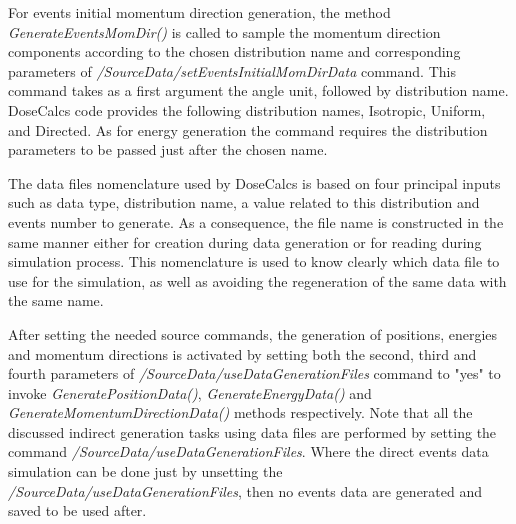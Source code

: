 \documentclass[letterpaper,12pt]{article}
\begin{document}
For events initial momentum direction generation, the method \textit{GenerateEventsMomDir()} is called to sample the momentum direction components according to the chosen distribution name and corresponding parameters of \textit{/SourceData/setEventsInitialMomDirData} command. This command takes as a first argument the angle unit, followed by distribution name. DoseCalcs code provides the following distribution names, Isotropic, Uniform, and Directed. As for energy generation the command requires the distribution parameters to be passed just after the chosen name.

The data files nomenclature used by DoseCalcs is based on four principal inputs such as data type, distribution name, a value related to this distribution and events number to generate. As a consequence, the file name is constructed in the same manner either for creation during data generation or for reading during simulation process. This nomenclature is used to know clearly which data file to use for the simulation, as well as avoiding the regeneration of the same data with the same name.

After setting the needed source commands, the generation of positions, energies and momentum directions is activated by setting both the second, third and fourth parameters of \textit{/SourceData/useDataGenerationFiles} command to "yes" to invoke \textit{GeneratePositionData()}, \textit{GenerateEnergyData()} and \textit{GenerateMomentumDirectionData()} methods respectively. Note that all the discussed indirect generation tasks using data files are performed by setting the command \textit{/SourceData/useDataGenerationFiles}. Where the direct events data simulation can be done just by unsetting the \textit{/SourceData/useDataGenerationFiles}, then no events data are generated and saved to be used after.
\end{document}
